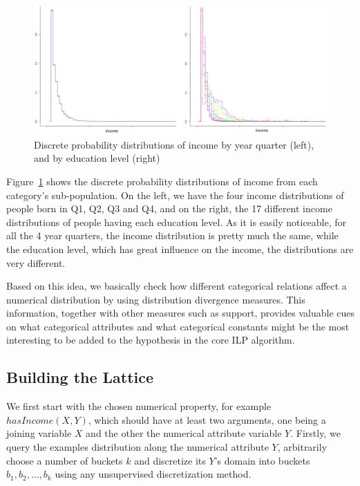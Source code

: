 \begin{figure}[h!]
\caption{Discrete probability distributions of income by year quarter (left), and by education level (right)}
\begin{center}
  \includegraphics[width=1\linewidth]{./Figures/birthquarter-education.png}
\end{center}
\label{fig:income-education}
\end{figure}

Figure~\ref{fig:income-education} shows the discrete probability distributions of income from each category's
sub-population. On the left, we have the four income distributions of people born in Q1, Q2, Q3 and Q4, and on the
right, the 17 different income distributions of people having each education level. As it is easily noticeable, for all
the 4 year quarters, the income distribution is pretty much the same, while the education level, which has great
influence on the income, the distributions are very different.

Based on this idea, we basically check how different categorical relations affect a numerical distribution by using
distribution divergence measures. This information, together with other measures such as support, provides valuable
cues on what categorical attributes and what categorical constants might be the most interesting to be added to the
hypothesis in the core ILP algorithm.


\subsection{Building the Lattice}

We first start with the chosen numerical property, for example $hasIncome(X,Y)$, which should have at least two
arguments, one being a joining variable $X$ and the other the numerical attribute variable $Y$. Firstly, we query the
examples distribution along the numerical attribute $Y$, arbitrarily choose a number of buckets $k$ and discretize
its $Y$'s domain into buckets $b_1, b_2, \dots, b_k$ using any unsupervised discretization method. 

